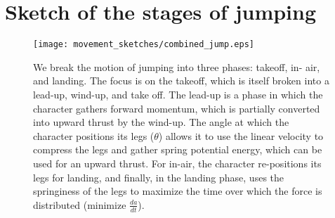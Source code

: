 \documentclass[landscape,26pt]{sciposter}
\begin{document}
\begin{minipage}[t]{10.5in}
		\section*{Sketch of the stages of jumping}
			\begin{figure}
				\centering
				\texttt{[image: movement\_sketches/combined\_jump.eps]}
				\caption{
			We break the motion of jumping into three phases: takeoff, in-	air, and landing.  The focus is on the takeoff, which is itself broken into a lead-up, wind-up, and take off.  The lead-up is a phase in which the character gathers forward momentum, which is partially converted into upward thrust by the wind-up.  The angle at which the character positions its legs ($\theta$) allows it to use the linear velocity to compress the legs and gather spring potential energy, which can be used for an upward thrust.  For in-air, the character re-positions its legs for landing, and finally, in the landing phase, uses the springiness of the legs to maximize the time over which the force is distributed (minimize $\frac{da}{dt}$).}
			\end{figure}
			
	\end{minipage}
	\hfill
\end{document}
